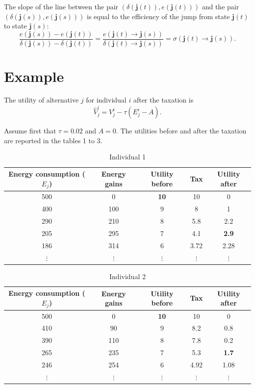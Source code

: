 \documentclass[empty, english]{javaudin}
\begin{document}
The slope of the line between the pair $(\delta(\mathbf{j}(t)), e(\mathbf{j}(t)))$ and the pair $(\delta(\mathbf{j}(s)), e(\mathbf{j}(s)))$ is equal to the efficiency of the jump from state $\mathbf{j}(t)$ to state $\mathbf{j}(s)$:
\begin{equation}
	\frac{e(\mathbf{j}(s)) - e(\mathbf{j}(t))}{\delta(\mathbf{j}(s)) - \delta(\mathbf{j}(t))} = \frac{e(\mathbf{j}(t) \rightarrow \mathbf{j}(s))}{\delta(\mathbf{j}(t) \rightarrow \mathbf{j}(s))} = \sigma(\mathbf{j}(t) \rightarrow \mathbf{j}(s)). 
\end{equation}



\section{Example}
\label{sec:Taxation}

The utility of alternative $j$ for individual $i$ after the taxation is
\[ \hat{V}^i_j = V^i_j - \tau(E^i_j - A). \]

Assume first that $\tau = 0.02$ and $A = 0$. The utilities before and after the taxation are reported in the tables 1 to 3.

\begin{table}[h]
	\centering
	\caption{Individual 1}
	\label{tab:label}
	\begin{tabular}{|c|c|c|c|c|}
		\hline
		Energy consumption ($E_j$) & Energy gains & Utility before & Tax & Utility after\\
		\hline
		500 & 0 & \textbf{10} & 10 & 0\\
		\hline
		400 & 100 & 9 & 8 & 1\\
		\hline
		290 & 210 & 8 & 5.8 & 2.2\\
		\hline
		205 & 295 & 7 & 4.1 & \textbf{2.9}\\
		\hline
		186 & 314 & 6 & 3.72 & 2.28\\
		\hline
		$\vdots$ & $\vdots$ & $\vdots$ & $\vdots$ & $\vdots$\\
		\hline
	\end{tabular}
\end{table}

\begin{table}[h]
	\centering
	\caption{Individual 2}
	\label{tab:label}
	\begin{tabular}{|c|c|c|c|c|}
		\hline
		Energy consumption ($E_j$) & Energy gains & Utility before & Tax & Utility after\\
		\hline
		500 & 0 & \textbf{10} & 10 & 0\\
		\hline
		410 & 90 & 9 & 8.2 & 0.8\\
		\hline
		390 & 110 & 8 & 7.8 & 0.2\\
		\hline
		265 & 235 & 7 & 5.3 & \textbf{1.7}\\
		\hline
		246 & 254 & 6 & 4.92 & 1.08\\
		\hline
		$\vdots$ & $\vdots$ & $\vdots$ & $\vdots$ & $\vdots$\\
		\hline
	\end{tabular}
\end{table}
\end{document}
